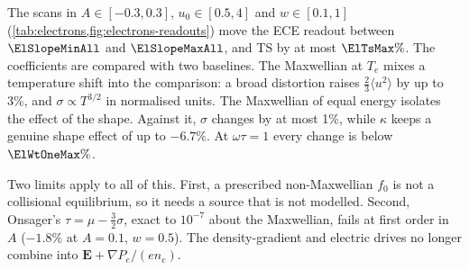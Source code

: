 \documentclass[11pt,a4paper]{article}
\newcommand{\ot}{\omega\tau}
\begin{document}
The scans in $A\in[-0.3,0.3]$, $u_0\in[0.5,4]$ and $w\in[0.1,1]$ (\cref{tab:electrons,fig:electrons-readouts}) move the ECE readout between
$\ElSlopeMinAll$ and $\ElSlopeMaxAll$, and TS by at most $\ElTsMax\%$. The coefficients are compared with two baselines.
The Maxwellian at $T_e$ mixes a temperature shift into the comparison: a broad distortion raises
$\tfrac23\langle u^2\rangle$ by up to 3\%, and $\sigma\propto T^{3/2}$ in normalised units. The Maxwellian of equal energy
isolates the effect of the shape. Against it, $\sigma$ changes by at most 1\%, while $\kappa$ keeps a genuine shape effect
of up to $-6.7\%$. At $\ot=1$ every change is below $\ElWtOneMax\%$.

Two limits apply to all of this. First, a prescribed non-Maxwellian $f_0$ is not a collisional equilibrium, so it needs
a source that is not modelled. Second, Onsager's $\tau=\mu-\tfrac32\sigma$, exact to $10^{-7}$ about the Maxwellian,
fails at first order in $A$ ($-1.8\%$ at $A=0.1$, $w=0.5$). The density-gradient and electric drives no longer combine
into $\mathbf E+\nabla P_e/(en_e)$.
\end{document}
